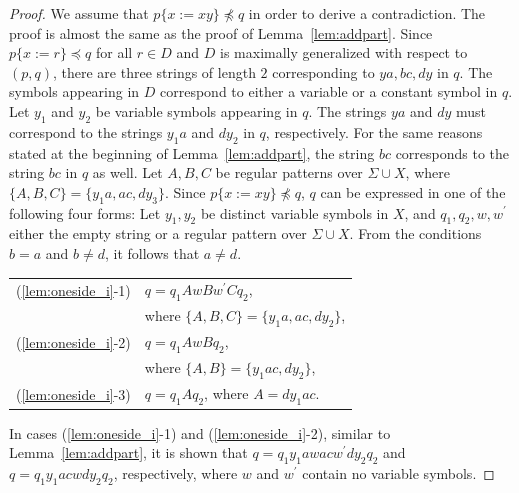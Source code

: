 
\smallskip

\begin{proof}
We assume that $p \{ x := xy \} \not \preceq q$ in order to derive a contradiction.
The proof is almost the same as the proof of Lemma~\ref{lem:addpart}.
Since $p \{ x := r \} \preceq q$ for all $r \in D$ and $D$ is maximally generalized {\color{red}with respect to} $(p,q)$, there are three strings of length $2$ corresponding to $ya, bc, dy$ in $q$.
The symbols appearing in $D$ correspond to either a variable or a constant symbol in $q$.
Let $y_{1}$ and $y_{2}$ be variable symbols appearing in $q$.
The strings $ya$ and $dy$ must correspond to the strings $y_{1}a$ and $dy_{2}$ in $q$, respectively.
For the same reasons stated at the beginning of Lemma~\ref{lem:addpart}, the string $bc$ corresponds to the string $bc$ in $q$ as well.
Let $A,B,C$ be regular patterns {\color{red}over} $\Sigma \cup X$, where $\{ A,B,C \} = \{ y_{1}a,ac,dy_{3} \}$.
Since $p \{ x := xy \} \not \preceq q$, $q$ can be expressed in one of the following four forms:
Let $y_{1}, y_{2}$ be distinct variable symbols in $X$, and $q_{1}, q_{2}, w, w^{\prime}$ either the empty string or a regular pattern {\color{red}over} $\Sigma\cup X$.
From the conditions $b = a$ and $b \not= d$, it follows that $a \not= d$.

\smallskip

\begin{tabular}{ll}
(\ref{lem:oneside_i}-1) & $q=q_{1}AwBw^{\prime}Cq_{2}$,\\
& where $\{ A,B,C \} = \{ y_{1}a,ac,dy_{2} \}$,\\
(\ref{lem:oneside_i}-2) & $q=q_{1}AwBq_{2}$,\\
& where $\{ A,B \} = \{ y_{1}ac,dy_{2} \}$,\\
(\ref{lem:oneside_i}-3) & $q=q_{1}Aq_{2}$, where $A = dy_{1}ac$.
\end{tabular}

\smallskip

In cases (\ref{lem:oneside_i}-1) and (\ref{lem:oneside_i}-2), similar to Lemma~\ref{lem:addpart}, it is shown that $q=q_{1}y_{1}awacw^{\prime}dy_{2}q_{2}$ and $q=q_{1}y_{1}acwdy_{2}q_{2}$, respectively, where $w$ and $w^{\prime}$ contain no variable symbols.


\end{proof}
